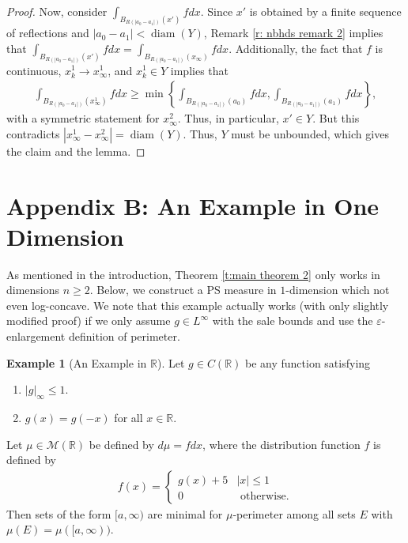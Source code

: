 \documentclass[12pt]{amsart}
\numberwithin{equation}{section}
\theoremstyle{plain}
\theoremstyle{definition}
\newtheorem{example}[theorem]{Example}
\newcommand{\diam}{\mathop\mathrm{diam}\nolimits}
\begin{document}
\begin{proof}
Now, consider $\int_{B_{R(|a_0 - a_1|)}(x')}fdx$.  Since $x'$ is obtained by a finite sequence of reflections and $|a_0 -a_1|< \diam(Y)$, Remark \ref{r: nbhds remark 2} implies that $\int_{B_{R(|a_0 - a_1|)}(x')}fdx = \int_{B_{R(|a_0 - a_1|)}(x_{\infty})}fdx$.  Additionally, the fact that $f$ is continuous, $x^1_k \rightarrow x^1_{\infty}$, and $x^1_k \in Y$ implies that
\begin{align*}
    \int_{B_{R(|a_0 - a_1|)}(x^1_{\infty})}fdx \ge \min \left\{\int_{B_{R(|a_0 - a_1|)}(a_0)}fdx, \int_{B_{R(|a_0 - a_1|)}(a_1)}fdx\right\},
\end{align*}
with a symmetric statement for $x^2_{\infty}$. Thus, in particular, $x' \in Y$. But this contradicts $|x^1_\infty - x^2_\infty| = \diam(Y)$.  Thus, $Y$ must be unbounded, which gives the claim and the lemma.
\end{proof}


\section{Appendix B: An Example in One Dimension}

As mentioned in the introduction, Theorem \ref{t:main theorem 2} only works in dimensions $n \ge 2$.  Below, we construct a PS measure in $1$-dimension which not even log-concave.  We note that this example actually works (with only slightly modified proof) if we only assume $g \in L^{\infty}$ with the sale bounds and use the $\varepsilon$-enlargement definition of perimeter.

\begin{example}[An Example in $\mathbb{R}$]\label{ex:1}
Let $g \in C(\mathbb{R})$ be any function satisfying 
\begin{enumerate}
    \item $|g|_{\infty} \le 1$.
    \item $g(x)= g(-x)$ for all $x \in \mathbb{R}$.
\end{enumerate} 
Let $\mu \in \mathcal{M}(\mathbb{R})$ be defined by $d\mu = f dx$, where the distribution function $f$ is defined by
\begin{align*}
    f(x) = \begin{cases}
    g(x) + 5 & |x| \le 1\\
    0& \text{ otherwise.}
    \end{cases}
\end{align*}
Then sets of the form $[a, \infty)$ are minimal for $\mu$-perimeter among all sets $E$ with $\mu(E) = \mu([a,\infty))$. 
\end{example}
\end{document}
